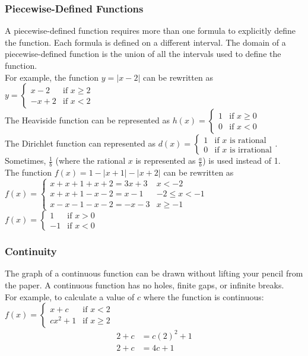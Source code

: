 \documentclass{article}
\begin{document}
	\subsubsection{Piecewise-Defined Functions}
	A piecewise-defined function requires more than one formula to explicitly define the function. Each formula is defined on a different interval. The domain of a piecewise-defined function is the union of all the intervals used to define the function.\\
	For example, the function $y=|x-2|$ can be rewritten as $y=\begin{cases}
		x-2&\text{if }x\geq2\\
		-x+2&\text{if }x<2
	\end{cases}$\\
	The Heaviside function can be represented as $h(x)=\begin{cases}
		1&\text{if }x\geq0\\
		0&\text{if }x<0
	\end{cases}$\\
	The Dirichlet function can represented as $d(x)=\begin{cases}
		1&\text{if }x\text{ is rational}\\
		0&\text{if }x\text{ is irrational}
	\end{cases}$. Sometimes, $\frac{1}{b}$ (where the rational $x$ is represented as $\frac{a}{b}$) is used instead of 1.\\
	The function $f(x)=1-|x+1|-|x+2|$ can be rewritten as $f(x)=\begin{cases}
		x+x+1+x+2=3x+3&x<-2\\x+x+1-x-2=x-1&-2\leq x<-1\\x-x-1-x-2=-x-3&x\geq-1
	\end{cases}$\\
	$f(x)=\begin{cases}
		1&\text{if }x>0\\
		-1&\text{if }x<0
	\end{cases}$
	
	\subsubsection{Continuity}
	The graph of a continuous function can be drawn without lifting your pencil from the paper. A continuous function has no holes, finite gaps, or infinite breaks.\\
	For example, to calculate a value of $c$ where the function is continuous: $f(x)=\begin{cases}
		x+c&\text{if }x<2\\
		cx^2+1&\text{if }x\geq2
	\end{cases}$
	\begin{align}
		2+c&=c(2)^2+1\\
		2+c&=4c+1\\
	\end{align}
\end{document}

